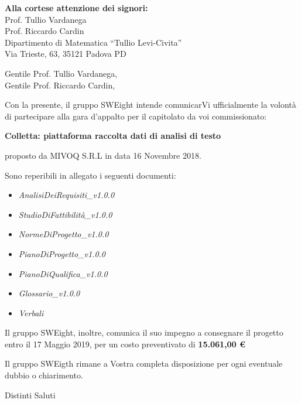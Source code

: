 \documentclass[11pt]{brownletter}
\date{Padova, 11 Gennaio 2019} %
\newcommand{\AdR}{\emph{AnalisiDeiRequisiti\_v1.0.0}}
\newcommand{\SdF}{\emph{StudioDiFattibilità\_v1.0.0}}
\newcommand{\NdP}{\emph{NormeDiProgetto\_v1.0.0}}
\newcommand{\PdP}{\emph{PianoDiProgetto\_v1.0.0}}
\newcommand{\PdQ}{\emph{PianoDiQualifica\_v1.0.0}}
\newcommand{\G}{\emph{Glossario\_v1.0.0}}
\begin{document}
\begin{letter}{\textbf{Alla cortese attenzione dei signori:}\\
	Prof. Tullio Vardanega\\
	Prof. Riccardo Cardin\\
	Dipartimento di Matematica “Tullio Levi-Civita”\\
	Via Trieste, 63, 35121 Padova PD}

\opening{	Gentile Prof. Tullio Vardanega,\\
			Gentile Prof. Riccardo Cardin,\\}

Con la presente, il gruppo SWEight intende comunicarVi ufficialmente la volontà di partecipare alla gara d'appalto per il capitolato da voi commissionato:
\begin{center}
	\textbf{Colletta: piattaforma raccolta dati di analisi di testo}
\end{center}
proposto da MIVOQ S.R.L in data 16 Novembre 2018.

Sono reperibili in allegato i seguenti documenti:
\begin{itemize}
	\item \AdR
	\item \SdF
	\item \NdP
	\item \PdP
	\item \PdQ
	\item \G
	\item \emph{Verbali}
\end{itemize}
Il gruppo SWEight, inoltre, comunica il suo impegno a consegnare il progetto entro il 17 Maggio 2019, per un costo preventivato di \textbf{15.061,00 \euro}

Il gruppo SWEigth rimane a Vostra completa disposizione per ogni eventuale dubbio o chiarimento.
\closing{Distinti Saluti}


\end{letter}
\end{document}
